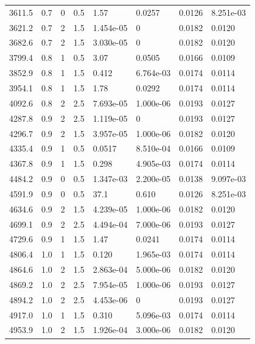 \documentclass[preview]{standalone}
\begin{document}
{{{\begin{tabular}{L{1.2cm}C{1.2cm} C{0.3cm}C{0.5cm} C{1.4cm}C{1.4cm} C{1.4cm}C{1.4cm}}
  3611.5  &   0.7  & 0     & 0.5 &  1.57  & 0.0257  & 0.0126 &  8.251e-03   \\ 
  3621.2  &   0.7  & 2     & 1.5 &  1.454e-05  & 0  & 0.0182 &  0.0120   \\ 
  3682.6  &   0.7  & 2     & 1.5 &  3.030e-05  & 0  & 0.0182 &  0.0120   \\ 
  3799.4  &   0.8  & 1     & 0.5 &  3.07  & 0.0505  & 0.0166 &  0.0109   \\ 
  3852.9  &   0.8  & 1     & 1.5 &  0.412  & 6.764e-03  & 0.0174 &  0.0114   \\ 
  3954.1  &   0.8  & 1     & 1.5 &  1.78  & 0.0292  & 0.0174 &  0.0114   \\ 
  4092.6  &   0.8  & 2     & 2.5 &  7.693e-05  & 1.000e-06  & 0.0193 &  0.0127   \\ 
  4287.8  &   0.9  & 2     & 2.5 &  1.119e-05  & 0  & 0.0193 &  0.0127   \\ 
  4296.7  &   0.9  & 2     & 1.5 &  3.957e-05  & 1.000e-06  & 0.0182 &  0.0120   \\ 
  4335.4  &   0.9  & 1     & 0.5 &  0.0517  & 8.510e-04  & 0.0166 &  0.0109   \\ 
  4367.8  &   0.9  & 1     & 1.5 &  0.298  & 4.905e-03  & 0.0174 &  0.0114   \\ 
  4484.2  &   0.9  & 0     & 0.5 &  1.347e-03  & 2.200e-05  & 0.0138 &  9.097e-03   \\ 
  4591.9  &   0.9  & 0     & 0.5 &  37.1  & 0.610  & 0.0126 &  8.251e-03   \\ 
  4634.6  &   0.9  & 2     & 1.5 &  4.239e-05  & 1.000e-06  & 0.0182 &  0.0120   \\ 
  4699.1  &   0.9  & 2     & 2.5 &  4.494e-04  & 7.000e-06  & 0.0193 &  0.0127   \\ 
  4729.6  &   0.9  & 1     & 1.5 &  1.47  & 0.0241  & 0.0174 &  0.0114   \\ 
  4806.4  &   1.0  & 1     & 1.5 &  0.120  & 1.965e-03  & 0.0174 &  0.0114   \\ 
  4864.6  &   1.0  & 2     & 1.5 &  2.863e-04  & 5.000e-06  & 0.0182 &  0.0120   \\ 
  4869.2  &   1.0  & 2     & 2.5 &  7.954e-05  & 1.000e-06  & 0.0193 &  0.0127   \\ 
  4894.2  &   1.0  & 2     & 2.5 &  4.453e-06  & 0  & 0.0193 &  0.0127   \\ 
  4917.0  &   1.0  & 1     & 1.5 &  0.310  & 5.096e-03  & 0.0174 &  0.0114   \\ 
  4953.9  &   1.0  & 2     & 1.5 &  1.926e-04  & 3.000e-06  & 0.0182 &  0.0120   \\ 

\end{tabular}}}}
\end{document}
